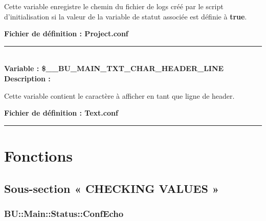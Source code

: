 \documentclass[a4paper,10pt]{article}
\begin{document}
\begin{justify}
    Cette variable enregistre le chemin du fichier de logs créé par le script d'initialisation si la valeur de la variable de statut associée est définie à \textbf{\color{gray}true}.
\end{justify}

\textbf{Fichier de définition : \color{lime}Project.conf} \\[1\baselineskip]



\color{vars}\par\noindent\rule{\textwidth}{0.4pt}\color{text}\\[1\baselineskip]

\textbf{Variable : \color{vars}\$\_\_BU\_MAIN\_TXT\_CHAR\_HEADER\_LINE}\\[1\baselineskip]

\textbf{Description :}

\begin{justify}
    Cette variable contient le caractère à afficher en tant que ligne de header.
\end{justify}

\textbf{Fichier de définition : \color{lime}Text.conf}\\[1\baselineskip]





\color{sec1}\par\noindent\rule{\textwidth}{0.4pt}\color{text}

\color{sec1}
\section{Fonctions}\color{text}

\color{sec2}
\subsection{Sous-section « CHECKING VALUES »}

\color{sec3}
\subsubsection{BU::Main::Status::ConfEcho}\color{text}
\end{document}
